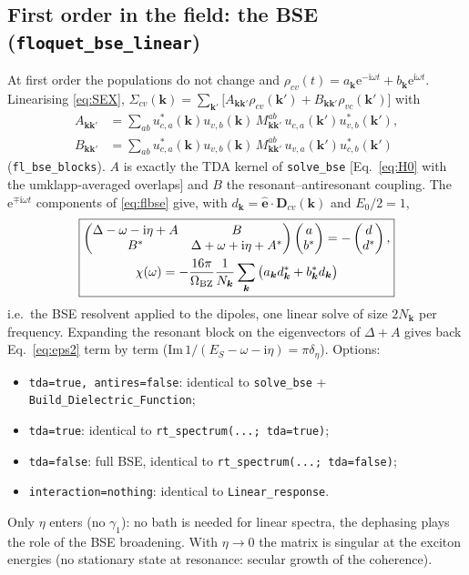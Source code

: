 \documentclass[11pt,a4paper]{article}
\newcommand{\ii}{\mathrm{i}}
\newcommand{\ee}{\mathrm{e}}
\newcommand{\kk}{\bm{k}}
\newcommand{\hate}{\hat{\bm{e}}}
\newcommand{\code}[1]{\texttt{#1}}
\newcommand{\Nk}{N_{\bm k}}
\begin{document}
\subsection{First order in the field: the BSE (\code{floquet\_bse\_linear})}
At first order the populations do not change and $\rho_{cv}(t)=a_{\kk}\ee^{-\ii\omega t}+b_{\kk}\ee^{\ii\omega t}$. Linearising \eqref{eq:SEX},
$\Sigma_{cv}(\kk)=\sum_{\kk'}\big[A_{\kk\kk'}\rho_{cv}(\kk')+B_{\kk\kk'}\rho_{vc}(\kk')\big]$ with
\begin{align}
A_{\kk\kk'}&=\sum_{ab}u^*_{c,a}(\kk)u_{v,b}(\kk)\,M^{ab}_{\kk\kk'}\,u_{c,a}(\kk')u^*_{v,b}(\kk'),\\
B_{\kk\kk'}&=\sum_{ab}u^*_{c,a}(\kk)u_{v,b}(\kk)\,M^{ab}_{\kk\kk'}\,u_{v,a}(\kk')u^*_{c,b}(\kk')
\end{align}
(\code{fl\_bse\_blocks}). $A$ is exactly the TDA kernel of \code{solve\_bse} [Eq.~\eqref{eq:H0} with the umklapp-averaged overlaps] and $B$ the
resonant--antiresonant coupling. The $\ee^{\mp\ii\omega t}$ components of \eqref{eq:flbse} give, with $d_{\kk}=\hate\cdot\bm D_{cv}(\kk)$ and $E_0/2=1$,
\begin{equation}
\boxed{\begin{gathered}\begin{pmatrix}\Delta-\omega-\ii\eta+A & B\\ B^* & \Delta+\omega+\ii\eta+A^*\end{pmatrix}
\begin{pmatrix}a\\ b^*\end{pmatrix}=-\begin{pmatrix}d\\ d^*\end{pmatrix},\\
\chi(\omega)=-\frac{16\pi}{\Omega_{\rm BZ}}\frac{1}{\Nk}\sum_{\kk}\big(a_{\kk}d^*_{\kk}+b^*_{\kk}d_{\kk}\big)\end{gathered}}
\label{eq:flbse_lin}
\end{equation}
i.e.\ the BSE resolvent applied to the dipoles, one linear solve of size $2\Nk$ per frequency. Expanding the resonant block on the
eigenvectors of $\Delta+A$ gives back Eq.~\eqref{eq:eps2} term by term ($\mathrm{Im}\,1/(E_S-\omega-\ii\eta)=\pi\delta_\eta$). Options:
\begin{itemize}[leftmargin=1.5em,itemsep=0pt]
\item \code{tda=true, antires=false}: identical to \code{solve\_bse} + \code{Build\_Dielectric\_Function};
\item \code{tda=true}: identical to \code{rt\_spectrum(...; tda=true)};
\item \code{tda=false}: full BSE, identical to \code{rt\_spectrum(...; tda=false)};
\item \code{interaction=nothing}: identical to \code{Linear\_response}.
\end{itemize}
Only $\eta$ enters (no $\gamma_1$): no bath is needed for linear spectra, the
dephasing plays the role of the BSE broadening. With $\eta\to0$ the matrix is singular at the exciton energies (no stationary state at
resonance: secular growth of the coherence).
\end{document}

